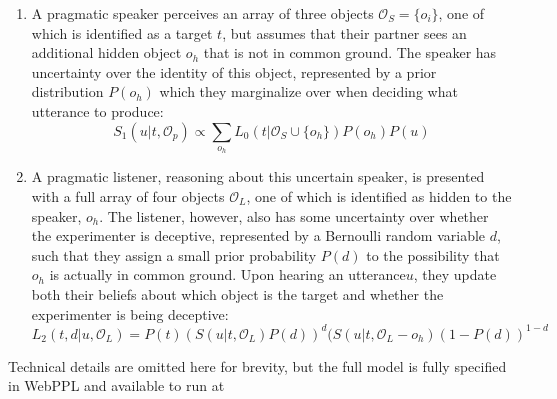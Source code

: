 \documentclass[manuscript]{stjour}
\begin{document}
\begin{enumerate}
\item A pragmatic speaker perceives an array of three objects $\mathcal{O}_S = \{o_i\}$, one of which is identified as a target $t$, but assumes that their partner sees an additional hidden object $o_h$ that is not in common ground. The speaker has uncertainty over the identity of this object, represented by a prior distribution $P(o_h)$ which they marginalize over when deciding what utterance to produce:
$$S_1(u | t, \mathcal{O}_p) \propto \sum_{o_h} L_0(t| \mathcal{O}_S \cup \{o_h\})P(o_h)P(u)$$

\item A pragmatic listener, reasoning about this uncertain speaker, is presented with a full array of four objects $\mathcal{O}_L$, one of which is identified as hidden to the speaker, $o_h$. The listener, however, also has some uncertainty over whether the experimenter is deceptive, represented by a Bernoulli random variable $d$, such that they assign a small prior probability $P(d)$ to the possibility that $o_h$ is actually in common ground. Upon hearing an utterance$u$, they update both their beliefs about which object is the target and whether the experimenter is being deceptive:
$$L_2(t, d | u, \mathcal{O}_L) = P(t)\left(S(u | t, \mathcal{O}_L)P(d)\right)^d(S(u | t, \mathcal{O}_L - o_h)(1-P(d))^{1-d}$$
\end{enumerate}
Technical details are omitted here for brevity, but the full model is fully specified in WebPPL and available to run at %
\end{document}
